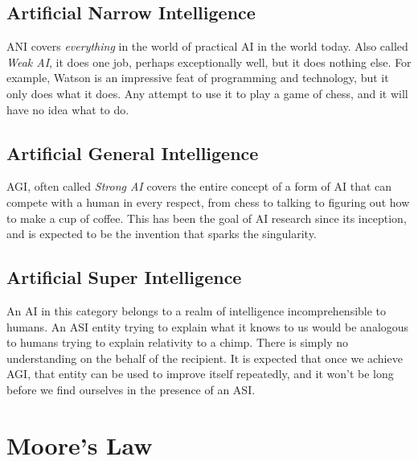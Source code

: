 \documentclass[12pt]{article} %
\begin{document}
\subsection{Artificial Narrow Intelligence} %

ANI covers \textit{everything} in the world of practical AI in the world today. Also called \textit{Weak AI}\cite{wikiani}, it does one job, perhaps exceptionally well, but it does nothing else. For example, Watson is an impressive feat of programming and technology, but it only does what it does. Any attempt to use it to play a game of chess, and it will have no idea what to do.


\subsection{Artificial General Intelligence} %

AGI, often called \textit{Strong AI}\cite{wikiagi} covers the entire concept of a form of AI that can compete with a human in every respect, from chess to talking to figuring out how to make a cup of coffee. This has been the goal of AI research since its inception, and is expected to be the invention that sparks the singularity.


\subsection{Artificial Super Intelligence} %

An AI in this category belongs to a realm of intelligence incomprehensible to humans\cite{wbw}. An ASI entity trying to explain what it knows to us would be analogous to humans trying to explain relativity to a chimp. There is simply no understanding on the behalf of the recipient. It is expected that once we achieve AGI, that entity can be used to improve itself repeatedly, and it won't be long before we find ourselves in the presence of an ASI.



\section{Moore's Law}
\end{document}
